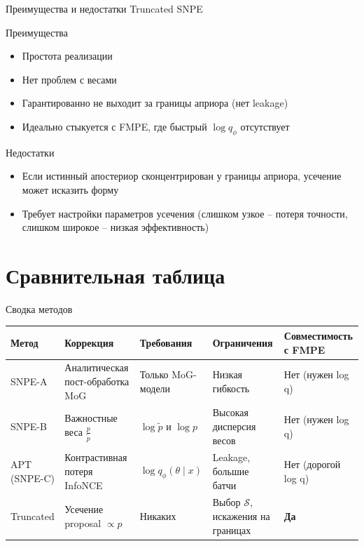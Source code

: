 \documentclass[10pt,aspectratio=169]{beamer}
\begin{document}
\begin{frame}{Преимущества и недостатки Truncated SNPE}
    \begin{block}{Преимущества}
        \begin{itemize}
            \item Простота реализации
            \item Нет проблем с весами
            \item Гарантированно не выходит за границы априора (нет leakage)
            \item Идеально стыкуется с FMPE, где быстрый $\log q_\phi$ отсутствует
        \end{itemize}
    \end{block}
    \pause
    \begin{block}{Недостатки}
        \begin{itemize}
            \item Если истинный апостериор сконцентрирован у границы априора, усечение может исказить форму
            \item Требует настройки параметров усечения (слишком узкое – потеря точности, слишком широкое – низкая эффективность)
        \end{itemize}
    \end{block}
\end{frame}

\section{Сравнительная таблица}

\begin{frame}{Сводка методов}
    \centering
    \begin{tabular}{@{}p{2cm} p{2.5cm} p{2.5cm} p{2.5cm} p{2.2cm}@{}}
        \toprule
        \textbf{Метод} & \textbf{Коррекция} & \textbf{Требования} & \textbf{Ограничения} & \textbf{Совместимость с FMPE} \\
        \midrule
        SNPE-A & Аналитическая пост-обработка MoG & Только MoG-модели & Низкая гибкость & Нет (нужен log q) \\
        \addlinespace
        SNPE-B & Важностные веса $\frac{p}{\tilde{p}}$ & $\log\tilde{p}$ и $\log p$ & Высокая дисперсия весов & Нет (нужен log q) \\
        \addlinespace
        APT (SNPE-C) & Контрастивная потеря InfoNCE & $\log q_\phi(\theta\mid x)$ & Leakage, большие батчи & Нет (дорогой log q) \\
        \addlinespace
        Truncated & Усечение proposal $\propto p$ & Никаких & Выбор $\mathcal{S}$, искажения на границах & \textbf{Да} \\
        \bottomrule
    \end{tabular}
\end{frame}
\end{document}
